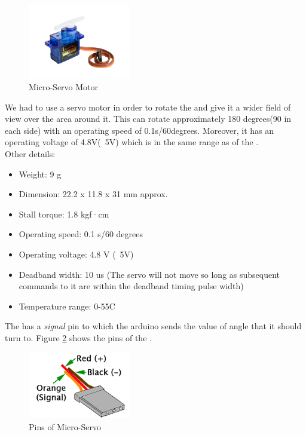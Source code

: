 \section{ \servo{} \motor{}}
\begin{figure}[H]
	\centering
	\includegraphics[width=0.4\textwidth]{../Files/tower-pro-sg90.jpg}
	\caption{Micro-Servo Motor}  \label{fig:Servo}
\end{figure}
We had to use a servo motor in order to rotate the \hcsr{} and give it a wider field of view over the area around it. This \servo{} can rotate approximately 180 degrees(90 in each side) with an operating speed of 0.1s/60degrees. Moreover, it has an operating voltage of 4.8V(~5V) which is in the same range as of the \arduinouno{}.\\
Other details:
\begin{itemize}
	\item Weight: 9 g
	\item Dimension: 22.2 x 11.8 x 31 mm approx.
	\item Stall torque: 1.8 kgf·cm
	\item Operating speed: 0.1 s/60 degrees
	\item Operating voltage: 4.8 V (~5V)
	\item Deadband width: 10 us (The servo will not move so long as subsequent commands to it are within the deadband timing pulse width)
	\item Temperature range: 0-55C
\end{itemize}
The \servo{} has a \emph{signal} pin to which the arduino sends the value of angle that it should turn to. Figure \ref{fig:pinServo} shows the pins of the \servo{}.
\begin{figure}[H]
	\centering
	\includegraphics[width=0.4\textwidth]{../Files/microservo.png}
	\caption{Pins of Micro-Servo}  \label{fig:pinServo}
\end{figure}
